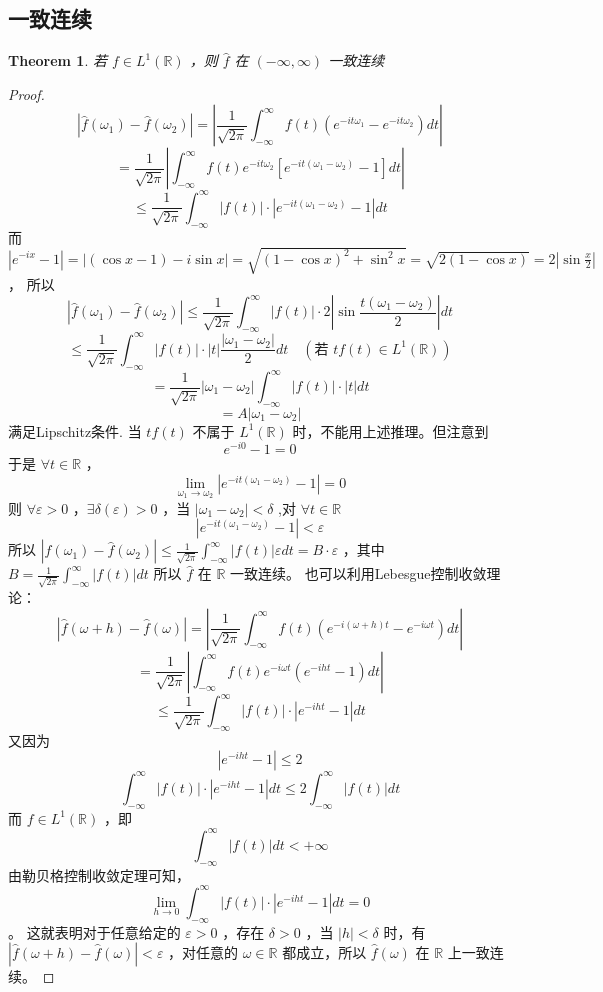 \documentclass[linespread=1.5,openany]{book}%
\theoremstyle{plain}
\newtheorem{theorem}{Theorem}
\begin{document}
{{				\subsection{一致连续}
				\begin{theorem}
					若 \(f \in L^1(\mathbb{R})\) ，则 \(\hat{f}\) 在 \((-\infty, \infty)\) 一致连续
				\end{theorem}
				\begin{proof}
					\[
					|\hat{f}(\omega_1) - \hat{f}(\omega_2)| = \left|\frac{1}{\sqrt{2\pi}}\int_{-\infty}^{\infty} f(t)(e^{-it\omega_1} - e^{-it\omega_2})dt\right|
					\]
					\[
					=\frac{1}{\sqrt{2\pi}}\left|\int_{-\infty}^{\infty} f(t)e^{-it\omega_2}[e^{-it(\omega_1 - \omega_2)} - 1]dt\right|
					\]
					\[
					\leq\frac{1}{\sqrt{2\pi}}\int_{-\infty}^{\infty}|f(t)|\cdot|e^{-it(\omega_1 - \omega_2)} - 1|dt
					\]
					而\(|e^{-ix} - 1| = |(\cos x - 1) - i\sin x| = \sqrt{(1 - \cos x)^2 + \sin^2 x}=\sqrt{2(1 - \cos x)} = 2|\sin\frac{x}{2}|\) ，
					所以
					\[
					|\hat{f}(\omega_1) - \hat{f}(\omega_2)| \leq\frac{1}{\sqrt{2\pi}}\int_{-\infty}^{\infty}|f(t)|\cdot 2\left|\sin\frac{t(\omega_1 - \omega_2)}{2}\right|dt
					\]
					\[
					\leq\frac{1}{\sqrt{2\pi}}\int_{-\infty}^{\infty}|f(t)|\cdot\left|t\right|\frac{|\omega_1 - \omega_2|}{2}dt \quad (\text{若 }tf(t) \in L^1(\mathbb{R}))
					\]
					\[
					=\frac{1}{\sqrt{2\pi}}|\omega_1 - \omega_2|\int_{-\infty}^{\infty}|f(t)|\cdot|t|dt
					\]
					\[
					= A|\omega_1 - \omega_2|
					\]
					满足Lipschitz条件.
					当 \(tf(t)\) 不属于 \(L^1(\mathbb{R})\) 时，不能用上述推理。但注意到\[e^{-i0} - 1 = 0\] 于是 \(\forall t \in \mathbb{R}\) ，\[\lim_{\omega_1 \to \omega_2}|e^{-it(\omega_1 - \omega_2)} - 1| = 0\] 
					则 \(\forall \varepsilon > 0\) ，\(\exists \delta(\varepsilon) > 0\) ，当 \(|\omega_1 - \omega_2| < \delta\) ,对 \(\forall t \in \mathbb{R}\) \[|e^{-it(\omega_1 - \omega_2)} - 1| < \varepsilon\] 
					所以 \(|\hat{f}(\omega_1) - \hat{f}(\omega_2)| \leq\frac{1}{\sqrt{2\pi}}\int_{-\infty}^{\infty}|f(t)|\varepsilon dt = B\cdot\varepsilon\) ，其中 \(B = \frac{1}{\sqrt{2\pi}}\int_{-\infty}^{\infty}|f(t)|dt\) 
					所以 \(\hat{f}\) 在 \(\mathbb{R}\) 一致连续。
					也可以利用Lebesgue控制收敛理论：
					\[|\hat{f}(\omega + h) - \hat{f}(\omega)| = \left|\frac{1}{\sqrt{2\pi}}\int_{-\infty}^{\infty} f(t)(e^{-i(\omega + h)t} - e^{-i\omega t})dt\right|\]
					\[=\frac{1}{\sqrt{2\pi}}\left|\int_{-\infty}^{\infty} f(t)e^{-i\omega t}(e^{-iht} - 1)dt\right|\]
					\[\leq\frac{1}{\sqrt{2\pi}}\int_{-\infty}^{\infty}|f(t)|\cdot|e^{-iht} - 1|dt
					\]
					又因为 \[|e^{-iht} - 1| \leq 2\]  \[\int_{-\infty}^{\infty}|f(t)|\cdot|e^{-iht} - 1|dt \leq 2\int_{-\infty}^{\infty}|f(t)|dt\] 而 \(f \in L^1(\mathbb{R})\) ，即 \[\int_{-\infty}^{\infty}|f(t)|dt < +\infty\] 
					由勒贝格控制收敛定理可知，\[\lim_{h \to 0}\int_{-\infty}^{\infty}|f(t)|\cdot|e^{-iht} - 1|dt = 0\] 。
					这就表明对于任意给定的 \(\varepsilon > 0\) ，存在 \(\delta > 0\) ，当 \(|h| < \delta\) 时，有 \(|\hat{f}(\omega + h) - \hat{f}(\omega)| < \varepsilon\) ，对任意的 \(\omega \in \mathbb{R}\) 都成立，所以 \(\hat{f}(\omega)\) 在 \(\mathbb{R}\) 上一致连续。
				\end{proof}	
			}
}
\end{document}
